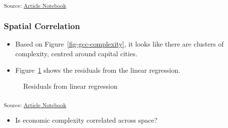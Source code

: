 \documentclass[
  number]{elsarticle}
\providecommand{\tightlist}{%
  \setlength{\itemsep}{0pt}\setlength{\parskip}{0pt}}\usepackage{longtable,booktabs,array}
\begin{document}
\textsubscript{Source:
\href{https://aiti-flinders.github.io/sirp-complexity/index.qmd.html}{Article
Notebook}}

\subsubsection{Spatial Correlation}\label{spatial-correlation}

\begin{itemize}
\item
  Based on Figure~\ref{fig-gcc-complexity}, it looks like there are
  clusters of complexity, centred around capital cities.
\item
  Figure~\ref{fig-residuals-map} shows the residuals from the linear
  regression.
\end{itemize}

\label{cell-fig-residuals-map}
\begin{figure}[H]


\caption{\label{fig-residuals-map}Residuals from linear regression}

\end{figure}%

\textsubscript{Source:
\href{https://aiti-flinders.github.io/sirp-complexity/index.qmd.html}{Article
Notebook}}

\begin{itemize}
\tightlist
\item
  Is economic complexity correlated across space?
\end{itemize}
\end{document}
